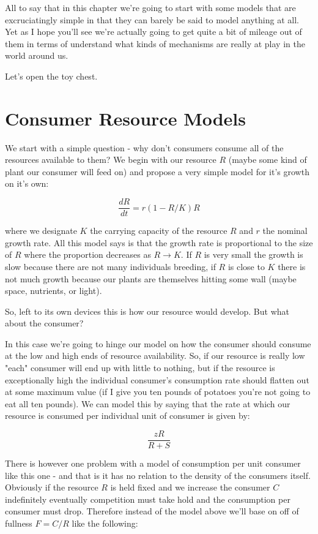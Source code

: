 \documentclass[11pt,a5paper]{book}
\begin{document}
All to say that in this chapter we're going to start with some models that are excruciatingly simple in that they can barely be said to model anything at all. Yet as I hope you'll see we're actually going to get quite a bit of mileage out of them in terms of understand what kinds of mechanisms are really at play in the world around us. 
\newline

Let's open the toy chest. 

\section{Consumer Resource Models}

We start with a simple question - why don't consumers consume all of the resources available to them? We begin with our resource $R$ (maybe some kind of plant our consumer will feed on) and propose a very simple model for it's growth on it's own:

$$\frac{dR}{dt} = r(1-R/K)R$$

where we designate $K$ the carrying capacity of the resource $R$ and $r$ the nominal growth rate. All this model says is that the growth rate is proportional to the size of $R$ where the proportion decreases as $R\rightarrow K$. If $R$ is very small the growth is slow because there are not many individuals breeding, if $R$ is close to $K$ there is not much growth because our plants are themselves hitting some wall (maybe space, nutrients, or light). 

So, left to its own devices this is how our resource would develop. But what about the consumer?

In this case we're going to hinge our model on how the consumer should consume at the low and high ends of resource availability. So, if our resource is really low "each" consumer will end up with little to nothing, but if the resource is exceptionally high the individual consumer's consumption rate should flatten out at some maximum value (if I give you ten pounds of potatoes you're not going to eat all ten pounds). We can model this by saying that the rate at which our resource is consumed per individual unit of consumer is given by:

$$\frac{zR}{R+S}$$

There is however one problem with a model of consumption per unit consumer like this one - and that is it has no relation to the density of the consumers itself. Obviously if the resource $R$ is held fixed and we increase the consumer $C$ indefinitely eventually competition must take hold and the consumption per consumer must drop. Therefore instead of the model above we'll base on off of fullness $F=C/R$ like the following:
\end{document}
